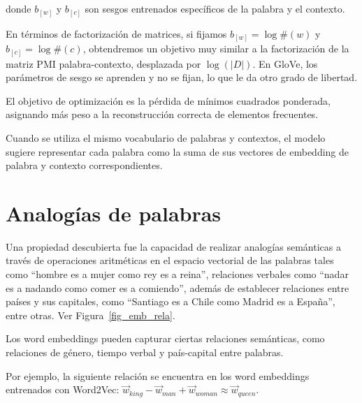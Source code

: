 donde $b_{[w]}$ y $b_{[c]}$ son sesgos entrenados específicos de la palabra y el contexto.

En términos de factorización de matrices, si fijamos $b_{[w]}=\log \#(w)$ y $b_{[c]}=\log \#(c)$, obtendremos un objetivo muy similar a la factorización de la matriz PMI palabra-contexto, desplazada por $\log (|D|)$.
En GloVe, los parámetros de sesgo se aprenden y no se fijan, lo que le da otro grado de libertad.

El objetivo de optimización es la pérdida de mínimos cuadrados ponderada, asignando más peso a la reconstrucción correcta de elementos frecuentes.

Cuando se utiliza el mismo vocabulario de palabras y contextos, el modelo sugiere representar cada palabra como la suma de sus vectores de embedding de palabra y contexto correspondientes.

\section{Analogías de palabras}
Una propiedad descubierta fue la capacidad de realizar analogías semánticas a través de operaciones aritméticas en el espacio vectorial de las palabras tales como ``hombre es a mujer como rey es a reina'', relaciones verbales como ``nadar es a nadando como comer es a comiendo'', además de establecer relaciones entre países y sus capitales, como ``Santiago es a Chile como Madrid es a España'', entre otras. Ver Figura~\ref{fig_emb_rela}.

Los word embeddings pueden capturar ciertas relaciones semánticas, como relaciones de género, tiempo verbal y país-capital entre palabras.

Por ejemplo, la siguiente relación se encuentra en los word embeddings entrenados con Word2Vec: $\vec{w}_{king} - \vec{w}_{man} + \vec{w}_{woman} \approx \vec{w}_{queen}$.

